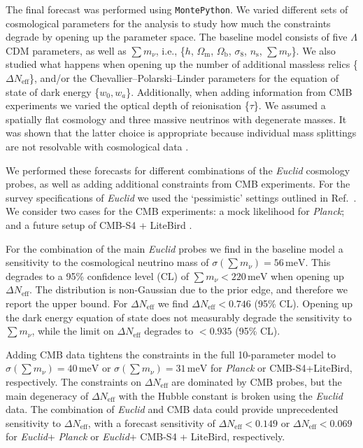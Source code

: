 \documentclass[a4paper,11pt]{article}
\newcommand{\euclid}{\textit{Euclid}\xspace}
\newcommand{\planck}{\textit{Planck}\xspace}
\newcommand{\dneff}{\Delta N_\mathrm{eff}}
\newcommand{\summnu}{\sum m_\nu}
\newcommand{\montepython}{\texttt{MontePython}\xspace}
\begin{document}
The final forecast was performed using \montepython. We varied different sets of cosmological parameters for the analysis to study how much the constraints degrade by opening up the parameter space. The baseline model consists of five $\varLambda$CDM parameters, as well as $\summnu$, i.e., \{$h$, $\Omega_\mathrm{m}$, $\Omega_\mathrm{b}$, $\sigma_8$, $n_\mathrm{s}$, $\summnu$\}. We also studied what happens when opening up the number of additional massless relics \{$\dneff$\}, and/or the Chevallier--Polarski--Linder parameters for the equation of state of dark energy \{$w_0,w_a$\}. Additionally, when adding information from CMB experiments we varied the optical depth of reionisation \{$\tau$\}. We assumed a spatially flat cosmology and three massive neutrinos with degenerate masses. It was shown that the latter choice is appropriate because individual mass splittings are not resolvable with cosmological data \cite{Lesgourgues:2013sjj}.

We performed these forecasts for different combinations of the \euclid cosmology probes, as well as adding additional constraints from CMB experiments. For the survey specifications of \euclid we used the `pessimistic' settings outlined in Ref.~\cite{Blanchard-EP7}. We consider two cases for the CMB experiments: a mock likelihood for \planck \cite{Planck:2018vyg}; and a future setup of CMB-S4 \cite{CMBS4} + LiteBird \cite{LiteBIRD}.

For the combination of the main \euclid probes we find in the baseline model a sensitivity to the cosmological neutrino mass of $\sigma\left(\summnu\right)=56\,\mathrm{meV}$. This degrades to a 95\% confidence level (CL) of $\summnu<220\,\mathrm{meV}$ when opening up $\dneff$. The distribution is non-Gaussian due to the prior edge, and therefore we report the upper bound. For $\dneff$ we find $\dneff<0.746$ (95\% CL). Opening up the dark energy equation of state does not measurably degrade the sensitivity to $\summnu$, while the limit on $\dneff$ degrades to $<0.935$ (95\% CL).  

Adding CMB data tightens the constraints in the full 10-parameter model to \mbox{$\sigma\left(\summnu\right)=40\,\mathrm{meV}$} or $\sigma\left(\summnu\right)=31\,\mathrm{meV}$ for \planck or CMB-S4+LiteBird, respectively. The constraints on $\dneff$ are dominated by CMB probes, but the main degeneracy of $\dneff$ with the Hubble constant is broken using the \euclid data. The combination of \euclid and CMB data could provide unprecedented sensitivity to $\dneff$, with a forecast sensitivity of $\dneff<0.149$ or $\dneff<0.069$ for \euclid + \planck or \euclid + CMB-S4 + LiteBird, respectively. 
\end{document}
